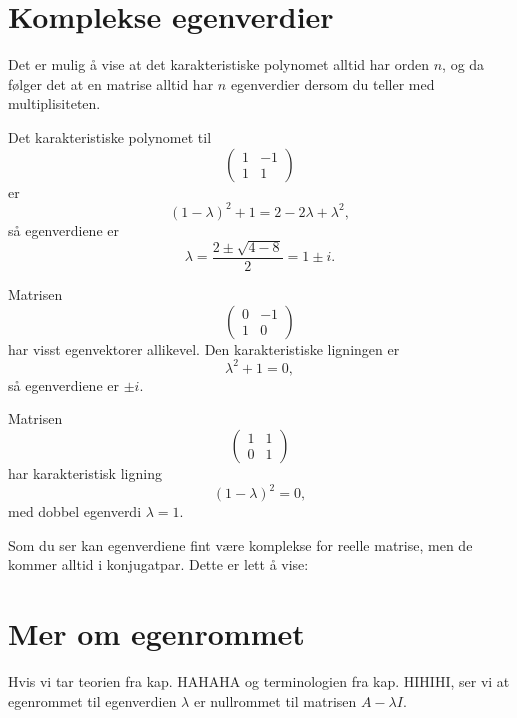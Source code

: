 \section*{Komplekse egenverdier}


Det er mulig å vise at det karakteristiske polynomet alltid har orden $n$, 
og da følger det at en matrise alltid har $n$ egenverdier dersom du 
teller med multiplisiteten. 

\begin{ex}
Det karakteristiske polynomet til
\[
\begin{pmatrix}
1 & -1 \\ 1 &1
\end{pmatrix}
\]
er 
\[
(1-\lambda)^2+1=2-2\lambda+\lambda^2,
\]
så egenverdiene er 
\[
\lambda=\frac{2\pm\sqrt{4-8}}{2}=1\pm i.
\] 
\end{ex}

\begin{ex}
Matrisen
\[
\begin{pmatrix}
0 & -1 \\ 1 &0
\end{pmatrix}
\]
har visst egenvektorer allikevel. Den karakteristiske ligningen er 
\[
\lambda^2+1=0,
\]
så egenverdiene er $\pm i$. 
\end{ex}

\begin{ex}
Matrisen
\[
\begin{pmatrix}
1 & 1 \\ 0 &1
\end{pmatrix}
\]
har karakteristisk ligning
\[
(1-\lambda)^2=0,
\]
med dobbel egenverdi $\lambda=1$. 
\end{ex}

Som du ser kan egenverdiene fint være komplekse for reelle matrise, men de kommer alltid i konjugatpar. 
Dette er lett å vise: 

\section*{Mer om egenrommet}
Hvis vi tar teorien fra kap. HAHAHA og terminologien fra kap. HIHIHI, ser vi at egenrommet til egenverdien $\lambda$ er nullrommet til matrisen $A-\lambda I$.

